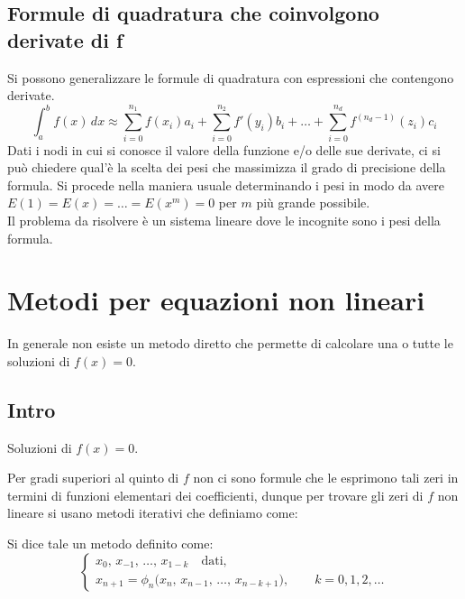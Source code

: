\documentclass[12pt,a4paper,]{report}
\begin{document}
\section{Formule di quadratura che coinvolgono derivate di f}
Si possono generalizzare le formule di quadratura con espressioni che contengono derivate.
\[
\int_a^b f(x)\,dx \approx \sum_{i=0}^{n_1} f(x_i)a_i + \sum_{i=0}^{n_2} f'(y_i)b_i + \ldots + \sum_{i=0}^{n_d} f^{(n_d-1)}(z_i)c_i
\]
Dati i nodi in cui si conosce il valore della funzione e/o delle sue derivate, ci si può chiedere qual'è la scelta dei pesi che massimizza il grado di precisione della formula. Si procede nella maniera usuale determinando i pesi in modo da avere $E(1) = E(x) = \ldots = E(x^m) = 0$ per $m$ più grande possibile.\\
Il problema da risolvere è un sistema lineare dove le incognite sono i pesi della formula.\\

\chapter{Metodi per equazioni non lineari}

\begin{lezione}
    [Lezione 19 06/05]
\end{lezione}
\noindent
In generale non esiste un metodo diretto che permette di calcolare una o tutte le soluzioni di $f(x) = 0$.
\section{Intro}
\begin{definizione}
    Soluzioni di $f(x) = 0$.
\end{definizione}
\noindent
Per gradi superiori al quinto di $f$ non ci sono formule che le esprimono tali zeri in termini di funzioni elementari dei coefficienti, dunque per trovare gli zeri di $f$ non lineare si usano metodi iterativi che definiamo come:


\begin{definizione}
    Si dice tale un metodo definito come:
    \[
    \begin{cases}
    x_0,\, x_{-1},\, \ldots,\, x_{1-k} \quad \text{dati}, \\[4pt]
    x_{n+1}
    = \phi_n \bigl( x_n,\, x_{n-1},\, \ldots,\, x_{n-k+1} \bigr),
    \qquad k = 0,1,2,\ldots
    \end{cases}
    \]
\end{definizione}
\end{document}
